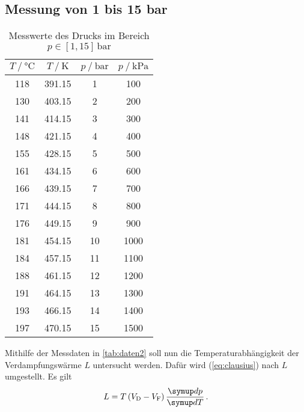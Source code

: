 \subsection{Messung von 1 bis 15 bar}

\begin{table} [h]
    \centering
    \caption{Messwerte des Drucks im Bereich $p \in [1, 15] \, \mathrm{bar}$}
    \label{tab:daten2}
    \begin{tabular}{c c c c}
        \toprule
        $T \mathbin{/} \unit{\celsius}$ & $T \mathbin{/} \unit{\kelvin}$ &  $p \mathbin{/} \unit{\bar}$ & $p \mathbin{/} \unit{\kilo\pascal}$ \\
        \midrule
        118 & 391.15 &    1 &  100 \\
        130 & 403.15 &    2 &  200 \\
        141 & 414.15 &    3 &  300 \\
        148 & 421.15 &    4 &  400 \\
        155 & 428.15 &    5 &  500 \\
        161 & 434.15 &    6 &  600 \\
        166 & 439.15 &    7 &  700 \\
        171 & 444.15 &    8 &  800 \\
        176 & 449.15 &    9 &  900 \\
        181 & 454.15 &   10 & 1000 \\
        184 & 457.15 &   11 & 1100 \\
        188 & 461.15 &   12 & 1200 \\
        191 & 464.15 &   13 & 1300 \\
        193 & 466.15 &   14 & 1400 \\
        197 & 470.15 &   15 & 1500 \\
        \bottomrule
        \end{tabular}
\end{table}

Mithilfe der Messdaten in \autoref{tab:daten2} soll nun die Temperaturabhängigkeit
der Verdampfungswärme $L$ untersucht werden. Dafür wird (\ref{eq:clausius}) nach $L$ umgestellt. Es gilt
\begin{equation}
    L = T \left(V_{\text{D}} - V_{\text{F}}\right) \frac {\dif{p}} {\dif{T}} \, . \label{eq:verdampfungswärme}
\end{equation}


